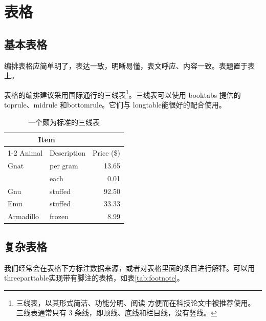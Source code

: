 \section{表格}

\subsection{基本表格}

编排表格应简单明了，表达一致，明晰易懂，表文呼应、内容一致。表题置于表上。

表格的编排建议采用国际通行的三线表\footnote{三线表，以其形式简洁、功能分明、阅读
方便而在科技论文中被推荐使用。三线表通常只有 3 条线，即顶线、底线和栏目线，没有竖线。}。三线表可以使用 booktabs 提供的 toprule、midrule 和bottomrule。它们与 longtable能很好的配合使用。

\begin{table}[!hpt]
  \caption[一个颇为标准的三线表]{一个颇为标准的三线表\footnotemark}
  \label{tab:firstone}
  \centering
  \begin{tabular}{@{}llr@{}} \toprule
    \multicolumn{2}{c}{Item} \\ \cmidrule(r){1-2}
    Animal & Description & Price (\$)\\ \midrule
    Gnat  & per gram  & 13.65 \\
          & each      & 0.01 \\
    Gnu   & stuffed   & 92.50 \\
    Emu   & stuffed   & 33.33 \\
    Armadillo & frozen & 8.99 \\ \bottomrule
  \end{tabular}
\end{table}
\subsection{复杂表格}

我们经常会在表格下方标注数据来源，或者对表格里面的条目进行解释。可以用threeparttable实现带有脚注的表格，如表\ref{tab:footnote}。

